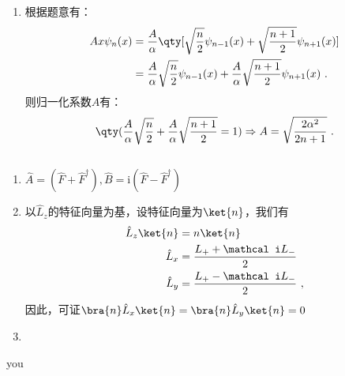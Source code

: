 
\begin{issues}
\issueDraft
\end{issues}

\subsection{ }
\begin{enumerate}
\item 根据题意有：
\begin{equation}
\begin{aligned}
Ax\psi_n(x)&=\frac{A}{\alpha}\qty[\sqrt{\frac{n}{2}}\psi_{n-1}(x)+\sqrt{\frac{n+1}{2}}\psi_{n+1}(x)] \\
&=\frac{A}{\alpha}\sqrt{\frac{n}{2}}\psi_{n-1}(x)+\frac{A}{\alpha}\sqrt{\frac{n+1}{2}}\psi_{n+1}(x)~.
\end{aligned}
\end{equation}
则归一化系数$A$有：
\begin{equation}
\qty(\frac{A}{\alpha}\sqrt{\frac{n}{2}}+\frac{A}{\alpha}\sqrt{\frac{n+1}{2}}=1)\Rightarrow A=\sqrt{\frac{2\alpha^2}{2n+1}}~.
\end{equation}
\end{enumerate}
\subsection{ }
\begin{enumerate}
\item $\hat A=(\hat F+\hat F^\dagger),\hat B=\mathrm i(\hat F-\hat F^\dagger)$
\item 以$\hat L_z$的特征向量为基，设特征向量为$\ket{n}$，我们有
\begin{equation}
\begin{aligned}
\hat L_z \ket{n}&=n\ket{n}\\
\hat L_x&=\frac{L_+ + \mathcal i L_-}{2}\\
\hat L_y&=\frac{L_+ -\mathcal i  L_-}{2}~,
\end{aligned}
\end{equation}
因此，可证$\bra{n}\hat L_x\ket{n}=\bra{n}\hat L_y\ket{n}=0$
\item 
\end{enumerate}
you
\subsection{ }
\subsection{ }
\subsection{ }
